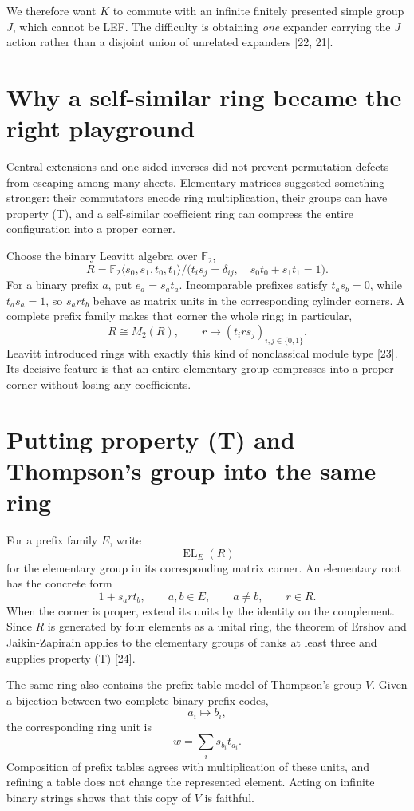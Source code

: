 \documentclass[10pt,openany]{book}
\newcommand{\refnum}[1]{\textnormal{[#1]}}
\newcommand{\EL}{\operatorname{EL}}
\begin{document}
We therefore want $K$ to commute with an infinite finitely presented simple group $J$, which cannot be LEF. The difficulty is obtaining \emph{one} expander carrying the $J$ action rather than a disjoint union of unrelated expanders \refnum{22, 21}.

\section{Why a self-similar ring became the right playground}

Central extensions and one-sided inverses did not prevent permutation defects from escaping among many sheets. Elementary matrices suggested something stronger: their commutators encode ring multiplication, their groups can have property (T), and a self-similar coefficient ring can compress the entire configuration into a proper corner.

Choose the binary Leavitt algebra over $\mathbb{F}_2$,
\[
 R=\mathbb{F}_2\langle s_0,s_1,t_0,t_1\rangle/
 \bigl(t_i s_j=\delta_{ij},\quad s_0t_0+s_1t_1=1\bigr).
\]
For a binary prefix $a$, put $e_a=s_at_a$. Incomparable prefixes satisfy $t_as_b=0$, while $t_as_a=1$, so $s_art_b$ behave as matrix units in the corresponding cylinder corners. A complete prefix family makes that corner the whole ring; in particular,
\[
 R\cong M_2(R),
 \qquad
 r\longmapsto (t_i r s_j)_{i,j\in\{0,1\}}.
\]
Leavitt introduced rings with exactly this kind of nonclassical module type \refnum{23}. Its decisive feature is that an entire elementary group compresses into a proper corner without losing any coefficients.

\section{Putting property (T) and Thompson's group into the same ring}

For a prefix family $E$, write
\[
 \EL_E(R)
\]
for the elementary group in its corresponding matrix corner. An elementary root has the concrete form
\[
 1+s_art_b,
 \qquad
 a,b\in E,
 \qquad
 a\ne b,
 \qquad
 r\in R.
\]
When the corner is proper, extend its units by the identity on the complement. Since $R$ is generated by four elements as a unital ring, the theorem of Ershov and Jaikin-Zapirain applies to the elementary groups of ranks at least three and supplies property (T) \refnum{24}.

The same ring also contains the prefix-table model of Thompson's group $V$. Given a bijection between two complete binary prefix codes,
\[
 a_i\longmapsto b_i,
\]
the corresponding ring unit is
\[
 w=\sum_i s_{b_i}t_{a_i}.
\]
Composition of prefix tables agrees with multiplication of these units, and refining a table does not change the represented element. Acting on infinite binary strings shows that this copy of $V$ is faithful.
\end{document}
